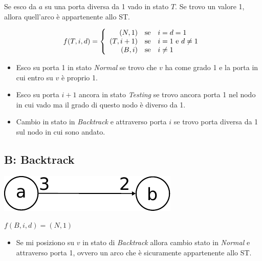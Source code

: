 Se esco da $a$ su una porta diversa da 1 vado in stato $T$. Se trovo un valore
1, allora quell'arco è appartenente allo ST.

\begin{equation}
    f(T,i,d) =
    \left\{
    \begin{array}{r
            @{\quad{\mbox{se}}\quad}
            l}
        (N,1)   & i = d = 1                   \\
        (T,i+1) & i = 1 ~\textrm{e}~ d \neq 1 \\
        (B,i)   & i \neq 1                    \\
    \end{array}
    \right.
\end{equation}
\begin{itemize}
    \item Esco su porta 1 in stato \textit{Normal} se trovo che $v$ ha come
          grado 1 e la porta in cui entro su $v$ è proprio 1.
    \item Esco su porta $i+1$ ancora in stato \textit{Testing} se trovo ancora
          porta 1 nel nodo in cui vado ma il grado di questo nodo è diverso da
          1.
    \item Cambio in stato in \textit{Backtrack} e attraverso porta $i$ se
          trovo porta diversa da 1 sul nodo in cui sono andato.
\end{itemize}

\subsection{B: Backtrack}
\begin{center}
    \includegraphics[scale=0.7]{capitoli/esplorazione-grafo-anonimo/imgs/n_28-2}
\end{center}

\begin{center}
    $f(B,i,d) = (N,1)$
\end{center}

\begin{itemize}
    \item Se mi posiziono su $v$ in stato di \textit{Backtrack} allora cambio
          stato in \textit{Normal} e attraverso porta 1, ovvero un arco che è
          sicuramente appartenente allo ST.
\end{itemize}

